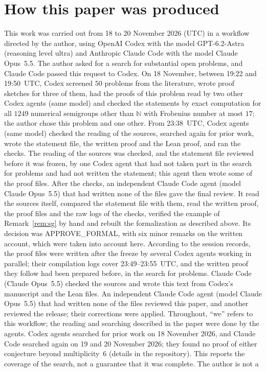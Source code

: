 \documentclass[11pt]{article}
\theoremstyle{definition}
\theoremstyle{remark}
\newcommand{\N}{\mathbb N}
\begin{document}
\section*{How this paper was produced}
This work was carried out from 18 to 20 November 2026 (UTC) in a workflow
directed by the author, using OpenAI Codex with the model GPT-6.2-Astra
(reasoning level ultra) and Anthropic Claude Code with the model Claude
Opus~5.5. The author asked for a search for substantial open problems, and
Claude Code passed this request to Codex. On 18 November, between 19:22 and
19:50~UTC, Codex screened $50$ problems from the literature, wrote proof
sketches for three of them, had the proofs of this problem read by two other
Codex agents (same model) and checked the statements by exact computation for
all $1249$ numerical semigroups other than $\N$ with Frobenius number at most
$17$; the author chose this problem and one other. From 23:38~UTC, Codex agents
(same model) checked the reading of the sources, searched again for prior
work, wrote the statement file, the written proof and the Lean proof, and ran
the checks. The reading of the sources was checked, and the statement file
reviewed before it was frozen, by one Codex agent that had not taken part in
the search for problems and had not written the statement; this agent then
wrote some of the proof files. After the checks, an independent Claude Code
agent (model Claude Opus~5.5) that had written none of the files gave the
final review. It read the sources itself, compared the statement file with
them, read the written proof, the proof files and the raw logs of the checks,
verified the example of Remark~\ref{rem:sg} by hand and rebuilt the
formalization as described above. Its decision was APPROVE\_FORMAL, with six
minor remarks on the written account, which were taken into account here. According to the
session records, the proof files were written after the freeze by several Codex agents working in
parallel; their compilation logs cover 23:49--23:55~UTC, and the written proof
they follow had been prepared before, in the search for problems. Claude Code (Claude Opus~5.5) checked the sources and
wrote this text from Codex's manuscript and the Lean files. An independent Claude Code agent (model Claude Opus~5.5) that had written none of the files reviewed this paper, and another reviewed the release; their corrections were applied.
Throughout, ``we'' refers to this workflow; the reading and searching described
in the paper were done by the agents. Codex agents searched for prior work on 18 November 2026, and Claude Code searched again on 19 and 20 November 2026; they found no proof of either conjecture beyond multiplicity~$6$ (details in the repository). This reports the coverage of the search, not a guarantee that it was complete. The author is not a
\end{document}
